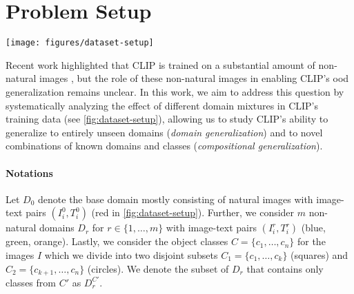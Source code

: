 \section{Problem Setup}\label{sec:problem-setup}
\begin{figure*}[t]
  \texttt{[image: figures/dataset-setup]}
  \caption{\textbf{Training data setups and CLIP's performance in these setups.}
  \textbf{A}: We systematically varied the domain mixture and object class exposure of CLIP's training data across four scenarios while controlling for other factors like dataset size and model choice. Specifically, we trained CLIP models on (1) mostly natural images (``Natural-only'') to obtain a lower performance bound, (2) a diverse set of domains excluding the test domain (``Leave-out-domain'') to assess its domain generalization, (3) natural images with a subset of test domain classes (``CG low-diversity'') to evaluate its compositional generalization, and (4) a combination of diverse domains plus a subset of test domain classes (``CG high-diversity'') for a more diverse compositional generalization setting.
  \textbf{B}: CLIP trained on diverse domains demonstrates stronger \acrshort{ood} generalization compared to training on only natural images or fewer domains. Remarkably, CLIP can perform as well or better even without exposure to some part (\ie, object classes) of the test domain during training.
  }
  \label{fig:dataset-setup}
\end{figure*}
Recent work highlighted that CLIP is trained on a substantial amount of non-natural images \citep[Table~2]{mayilvahanan2024search}, but the role of these non-natural images in enabling CLIP's \acrshort{ood} generalization remains unclear. In this work, we aim to address this question by systematically analyzing the effect of different domain mixtures in CLIP's training data (see \cref{fig:dataset-setup}), allowing us to study CLIP's ability to generalize to entirely unseen domains (\textit{domain generalization}) and to novel combinations of known domains and classes (\textit{compositional generalization}).

\paragraph{Notations}
Let $D_0$ denote the base domain mostly consisting of natural images with image-text pairs $(I^0_i, T^0_i)$ (\textcolor{fig1red}{red} in \cref{fig:dataset-setup}). Further, we consider $m$ non-natural domains $D_r$ for $r\in\{1,\dots,m\}$ with image-text pairs $(I^r_i, T^r_i)$ (\textcolor{fig1blue}{blue}, \textcolor{fig1green}{green}, \textcolor{fig1orange}{orange}).
Lastly, we consider the object classes $C = \{c_1,\dots,c_n\}$ for the images $I$ which we divide into two disjoint subsets $C_1 = \{c_1,\dots,c_k\}$ (squares) and $C_2 = \{c_{k+1},\dots,c_n\}$ (circles). We denote the subset of $D_r$ that contains only classes from $C'$ as $D_r^{C'}$.


